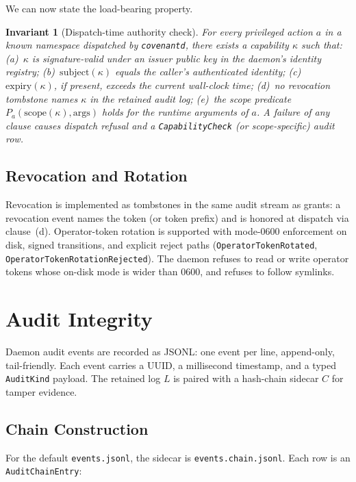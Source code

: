 \documentclass[11pt]{article}
\theoremstyle{plainsmall}
\newtheorem{invariant}{Invariant}
\begin{document}
We can now state the load-bearing property.

\begin{invariant}[Dispatch-time authority check]
\label{inv:dispatch}
For every privileged action $a$ in a known namespace dispatched by \texttt{covenantd}, there exists a capability $\kappa$ such that:
(a)~$\kappa$ is signature-valid under an issuer public key in the daemon's identity registry;
(b)~$\mathrm{subject}(\kappa)$ equals the caller's authenticated identity;
(c)~$\mathrm{expiry}(\kappa)$, if present, exceeds the current wall-clock time;
(d)~no revocation tombstone names $\kappa$ in the retained audit log;
(e)~the scope predicate $P_a(\mathrm{scope}(\kappa), \mathrm{args})$ holds for the runtime arguments of $a$.
A failure of any clause causes dispatch refusal and a \texttt{CapabilityCheck} (or scope-specific) audit row.
\end{invariant}

\subsection{Revocation and Rotation}

Revocation is implemented as tombstones in the same audit stream as grants: a revocation event names the token (or token prefix) and is honored at dispatch via clause~(d). Operator-token rotation is supported with mode-0600 enforcement on disk, signed transitions, and explicit reject paths (\texttt{OperatorTokenRotated}, \texttt{OperatorTokenRotationRejected}). The daemon refuses to read or write operator tokens whose on-disk mode is wider than 0600, and refuses to follow symlinks.

\section{Audit Integrity}
\label{sec:audit}

Daemon audit events are recorded as JSONL: one event per line, append-only, tail-friendly. Each event carries a UUID, a millisecond timestamp, and a typed \texttt{AuditKind} payload. The retained log $L$ is paired with a hash-chain sidecar $C$ for tamper evidence.

\subsection{Chain Construction}

For the default \texttt{events.jsonl}, the sidecar is \texttt{events.chain.jsonl}. Each row is an \texttt{AuditChainEntry}:
\end{document}
